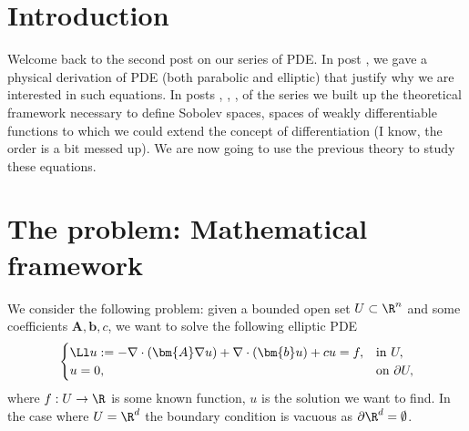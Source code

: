 \documentclass[
    a4paper,
    DIV=14,
    abstract=true,
    numbers=noenddot
]{scrartcl}
\begin{document}
\section{Introduction}
Welcome back to the second post on our series of PDE. In post , we gave a physical derivation of PDE (both parabolic and elliptic) that justify why we are interested in such equations. In posts , , ,  of the series we built up the theoretical framework necessary to define Sobolev spaces, spaces of weakly differentiable functions to which we could extend the concept of differentiation (I know, the order is a bit messed up).  We are now going to use the previous theory to study these equations.
\section{The problem: Mathematical framework}
We consider the following problem: given a bounded open set $U \subset \R^n$ and some coefficients $\bm{A},\bm{b},c$, we want to solve the following elliptic PDE
\begin{align}\label{PDE}
    \begin{cases}
        \Ll u:=  -\nabla \cdot (\bm{A} \nabla u)+ \nabla \cdot (\bm{b} u)+cu=f, & \text{in } U,          \\
        u=0,                                                                    & \text{on } \partial U,
    \end{cases}
\end{align}
where $f: U \to \R$ is some known function, $u$ is the solution we want to find. In the case where $U = \R^d$ the boundary condition is vacuous as $\partial \R^d = \emptyset$.
\end{document}
